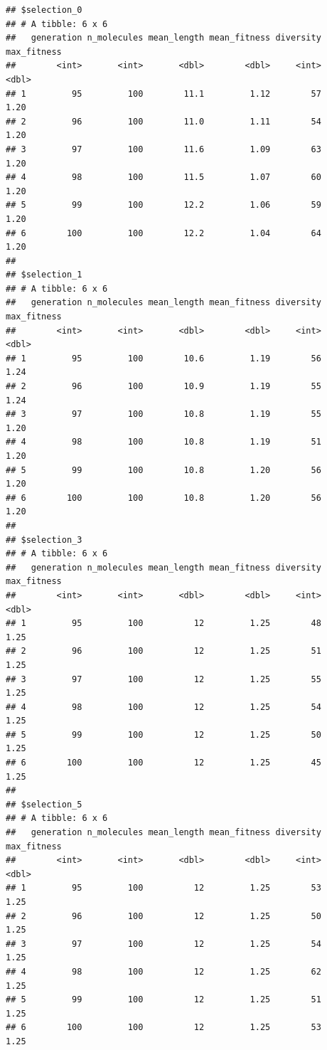 \documentclass[
  oneside,
  openany]{book}
\begin{document}
\begin{verbatim}
## $selection_0
## # A tibble: 6 x 6
##   generation n_molecules mean_length mean_fitness diversity max_fitness
##        <int>       <int>       <dbl>        <dbl>     <int>       <dbl>
## 1         95         100        11.1         1.12        57        1.20
## 2         96         100        11.0         1.11        54        1.20
## 3         97         100        11.6         1.09        63        1.20
## 4         98         100        11.5         1.07        60        1.20
## 5         99         100        12.2         1.06        59        1.20
## 6        100         100        12.2         1.04        64        1.20
## 
## $selection_1
## # A tibble: 6 x 6
##   generation n_molecules mean_length mean_fitness diversity max_fitness
##        <int>       <int>       <dbl>        <dbl>     <int>       <dbl>
## 1         95         100        10.6         1.19        56        1.24
## 2         96         100        10.9         1.19        55        1.24
## 3         97         100        10.8         1.19        55        1.20
## 4         98         100        10.8         1.19        51        1.20
## 5         99         100        10.8         1.20        56        1.20
## 6        100         100        10.8         1.20        56        1.20
## 
## $selection_3
## # A tibble: 6 x 6
##   generation n_molecules mean_length mean_fitness diversity max_fitness
##        <int>       <int>       <dbl>        <dbl>     <int>       <dbl>
## 1         95         100          12         1.25        48        1.25
## 2         96         100          12         1.25        51        1.25
## 3         97         100          12         1.25        55        1.25
## 4         98         100          12         1.25        54        1.25
## 5         99         100          12         1.25        50        1.25
## 6        100         100          12         1.25        45        1.25
## 
## $selection_5
## # A tibble: 6 x 6
##   generation n_molecules mean_length mean_fitness diversity max_fitness
##        <int>       <int>       <dbl>        <dbl>     <int>       <dbl>
## 1         95         100          12         1.25        53        1.25
## 2         96         100          12         1.25        50        1.25
## 3         97         100          12         1.25        54        1.25
## 4         98         100          12         1.25        62        1.25
## 5         99         100          12         1.25        51        1.25
## 6        100         100          12         1.25        53        1.25
\end{verbatim}
\end{document}
